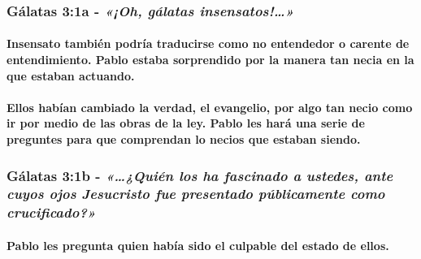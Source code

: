 \documentclass[11a pt,twoside]{article}
\newcommand{\scripture}[1]{%
  {\fontsize{12pt}{16pt}\selectfont\ScriptureFont\itshape #1}%
}
\let\oldsubsubsection\subsubsection
\renewcommand{\subsubsection}{\needspace{4\baselineskip}\oldsubsubsection}
\let\oldparagraph\paragraph
\renewcommand{\paragraph}{\needspace{3\baselineskip}\oldparagraph}
\begin{document}
\subsubsection{\texorpdfstring{Gálatas 3:1a -
\scripture{«¡Oh, gálatas insensatos!…»}}{Gálatas 3:1a - }}\label{guxe1latas-31a---oh-guxe1latas-insensatos}

\paragraph{Insensato también podría traducirse como no entendedor o
carente de entendimiento. Pablo estaba sorprendido por la manera tan
necia en la que estaban
actuando.}\label{insensato-tambiuxe9n-podruxeda-traducirse-como-no-entendedor-o-carente-de-entendimiento.-pablo-estaba-sorprendido-por-la-manera-tan-necia-en-la-que-estaban-actuando.}

\paragraph{Ellos habían cambiado la verdad, el evangelio, por algo tan
necio como ir por medio de las obras de la ley. Pablo les hará una serie
de preguntes para que comprendan lo necios que estaban
siendo.}\label{ellos-habuxedan-cambiado-la-verdad-el-evangelio-por-algo-tan-necio-como-ir-por-medio-de-las-obras-de-la-ley.-pablo-les-haruxe1-una-serie-de-preguntes-para-que-comprendan-lo-necios-que-estaban-siendo.}

\subsubsection{\texorpdfstring{Gálatas 3:1b -
\scripture{«…¿Quién los ha fascinado a ustedes, ante cuyos ojos Jesucristo fue presentado públicamente como crucificado?»}}{Gálatas 3:1b - }}\label{guxe1latas-31b---quiuxe9n-los-ha-fascinado-a-ustedes-ante-cuyos-ojos-jesucristo-fue-presentado-puxfablicamente-como-crucificado}

\paragraph{Pablo les pregunta quien había sido el culpable del estado de
ellos.}\label{pablo-les-pregunta-quien-habuxeda-sido-el-culpable-del-estado-de-ellos.}
\end{document}
